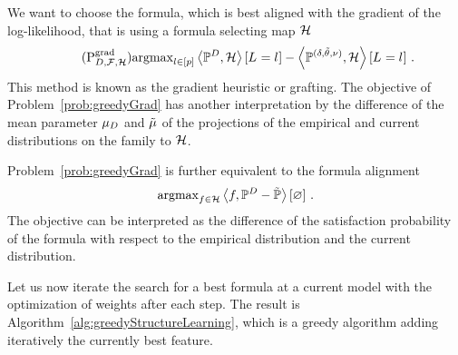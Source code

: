 We want to choose the formula, which is best aligned with the gradient of the log-likelihood, that is using a formula selecting map $\mathcal{H}$
\begin{align} \label{prob:greedyGrad} \tag{$\mathrm{P}^{\mathrm{grad}}_{\datamap,\formulaset,\fselectionmap}$}
	\argmax_{\selindex\in[\seldim]} \sbcontractionof{\empdistribution,\fselectionmap}{\indexedselvariable}
	- \sbcontractionof{\expdistof{(\naivestat, \naivecanparam, \basemeasure)},\fselectionmap}{\indexedselvariable} \, .
\end{align}
This method is known as the gradient heuristic or grafting.
The objective of Problem~\eqref{prob:greedyGrad} has another interpretation by the difference of the mean parameter $\mu_{D}$ and $\tilde{\mu}$ of the projections of the empirical and current distributions on the family to $\mathcal{H}$. %

Problem~\eqref{prob:greedyGrad} is further equivalent to the formula alignment
\begin{align*}
	\mathrm{argmax}_{f\in\mathcal{H}} \left\langle f,\mathbb{P}^{D}-\tilde{\mathbb{P}}\right\rangle \left[ \varnothing \right] \, .
\end{align*}
The objective can be interpreted as the difference of the satisfaction probability of the formula with respect to the empirical distribution and the current distribution.













Let us now iterate the search for a best formula at a current model with the optimization of weights after each step.
The result is Algorithm~\ref{alg:greedyStructureLearning}, which is a greedy algorithm adding iteratively the currently best feature.

